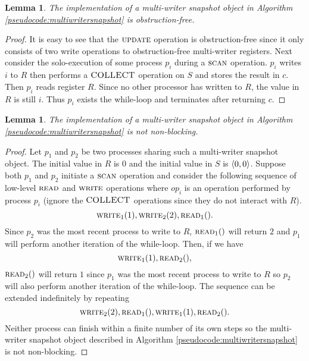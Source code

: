 \documentclass[11pt]{article}
\newcommand\writeF{\textsc{write}}
\newcommand\updateF{\textsc{update}}
\newcommand\scanF{\textsc{scan}}
\newcommand\COLLECT{\textsc{COLLECT}}
\newcommand\readF{\textsc{read}}
\newtheorem{lemma}[theorem]{Lemma}
\DeclarePairedDelimiter\anglebrac{\langle}{\rangle}
\begin{document}
\begin{lemma}
\label{lem:obsfree}
The implementation of a multi-writer snapshot object in Algorithm \ref{pseudocode:multiwritersnapshot} is obstruction-free.
\end{lemma}
\begin{proof}
It is easy to see that the $\updateF$ operation is obstruction-free since it only consists of two write operations to obstruction-free multi-writer registers. Next consider the solo-execution of some process $p_i$ during a $\scanF$ operation. $p_i$ writes $i$ to $R$ then performs a $\COLLECT$ operation on $S$ and stores the result in $c$. Then $p_i$ reads register $R$. Since no other processor has written to $R$, the value in $R$ is still $i$. Thus $p_i$ exists the while-loop and terminates after returning $c$. 
\end{proof}

\begin{lemma}
\label{lem:notnonblock}
The implementation of a multi-writer snapshot object in Algorithm \ref{pseudocode:multiwritersnapshot} is not non-blocking.
\end{lemma}
\begin{proof}
Let $p_1$ and $p_2$ be two processes sharing such a multi-writer snapshot object. The initial value in $R$ is $0$ and the initial value in $S$ is $\anglebrac{0,0}$. Suppose both $p_1$ and $p_2$ initiate a $\scanF$ operation and consider the following sequence of low-level $\readF$ and $\writeF$ operations where $op_i$ is an operation performed by process $p_i$ (ignore the $\COLLECT$ operations since they do not interact with $R$).
\[\writeF_1(1), \writeF_2(2), \readF_1().\] 
Since $p_2$ was the most recent process to write to $R$, $\readF_1()$ will return $2$ and $p_1$ will perform another iteration of the while-loop. Then, if we have
\[\writeF_1(1), \readF_2(),\]
$\readF_2()$ will return $1$ since $p_1$ was the most recent process to write to $R$ so $p_2$ will also perform another iteration of the while-loop. The sequence can be extended indefinitely by repeating
\[\writeF_2(2), \readF_1(), \writeF_1(1), \readF_2().\] 
Neither process can finish within a finite number of its own steps so the multi-writer snapshot object described in Algorithm \ref{pseudocode:multiwritersnapshot} is not non-blocking.
\end{proof}
\end{document}
